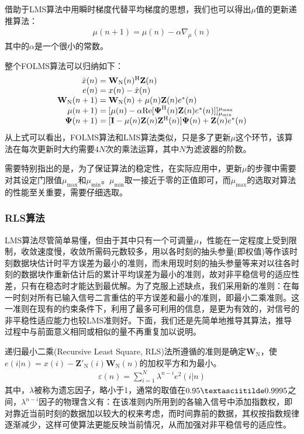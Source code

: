 借助于LMS算法中用瞬时梯度代替平均梯度的思想，我们也可以得出$\mu$值的更新递推算法：
\begin{eqnarray}
    \mu(n+1)=\mu(n)-\alpha\nabla_{\mu}(n)
    \label{equ:2.22}
\end{eqnarray}
其中的$\alpha$是一个很小的常数。

整个FOLMS算法可以归纳如下：
\begin{eqnarray}
    \begin{array}{r@{\;=\;}l}
        \hat{x}(n)&\mathbf{W}_{\mathrm{N}}(n)^{\mathrm{H}}\mathbf{Z}(n)\\
        e(n)&x(n)-\hat{x}(n)\\
        \mathbf{W}_{\mathrm{N}}(n+1)&\mathbf{W}_{\mathrm{N}}(n)+\mu(n)\mathbf{Z}(n)e^*(n)\\
        \mu(n+1)&[\mu(n)-\alpha\mathrm{Re}[\boldsymbol{\Psi}^{\mathrm{H}}(n)\mathbf{Z}(n)e^*(n)]]_{\mu_{\mathrm{min}}}^{\mu_{\mathrm{max}}}\\
        \boldsymbol{\Psi}(n+1)&[\mathbf{I}-\mu(n)\mathbf{Z}(n)\mathbf{Z}^{\mathrm{H}}(n)]\boldsymbol{\Psi}(n)+\mathbf{Z}(n)e^*(n)
    \end{array}
    \label{equ:2.23}
\end{eqnarray}
从上式可以看出，FOLMS算法和LMS算法类似，只是多了更新$\mu$这个环节，该算法在每次更新时大约需要$4N$次的乘法运算，其中$N$为滤波器的阶数。

需要特别指出的是，为了保证算法的稳定性，在实际应用中，更新$\mu$的步骤中需要对其设定门限值$\mu_{\mathrm{max}}$和$\mu_{\mathrm{min}}$。$\mu_{\mathrm{min}}$取一接近于零的正值即可，而$\mu_{\mathrm{max}}$的选取对算法的性能至关重要，需要仔细选取\citep{Geller1996}。
\subsubsection*{RLS算法}
LMS算法尽管简单易懂，但由于其中只有一个可调量$\mu$，性能在一定程度上受到限制，收敛速度慢，收敛所需码元数较多，用以各时刻的抽头参量(即权值)等作该时刻数据块估计时平方误差为最小的准则，而未用现时刻的抽头参量等来对以往各时刻的数据块作重新估计后的累计平均误差为最小的准则，故对非平稳信号的适应性差，只有在稳态时才能达到最优解。为了克服上述缺点，我们采用新的准则：在每一时刻对所有已输入信号二言重估的平方误差和最小的准则，即最小二乘准则。这一准则在现有的约束条件下，利用了最多可利用的信息，是更为有效的，对信号的非平稳性适应能力也较LMS准则好。下面，我们还是先简单地推导其算法，推导过程中与前面意义相同或相似的量不再重复加以说明。

递归最小二乘(Recursive Least Square,
RLS)法所遵循的准则是确定$\mathbf{W}_{\mathrm{N}}$，使$e(i|n)=x(i)-{\mathbf{Z}}'_{\mathrm{N}}(i)\mathbf{W}_{\mathrm{N}}(n)$的加权平方和为最小。
\begin{eqnarray}
    \varepsilon(n)=\sum_{i=1}^N\lambda^{n-i}e^2(i|n)
    \label{equ:2.24}
\end{eqnarray}
其中，$\lambda$被称为遗忘因子，略小于1，通常的取值在$0.95\textasciitilde
0.9995$之间，$\lambda^{n-i}$因子的物理含义有：在该准则内所用到的各输入信号中添加指数权，即对靠近当前时刻的数据加以较大的权来考虑，而时间靠前的数据，其权按指数规律逐渐减少，这样可使算法更能反映当前情况，从而加强对非平稳信号的适应性。


